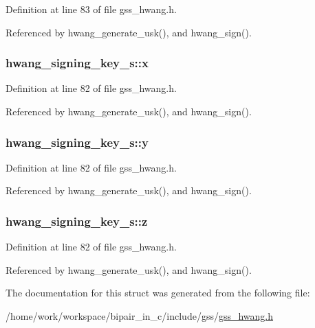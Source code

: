 Definition at line 83 of file gss\-\_\-hwang.\-h.



Referenced by hwang\-\_\-generate\-\_\-usk(), and hwang\-\_\-sign().

\hypertarget{structhwang__signing__key__s_a4bc042988eb9502f13b5d9a39d464162}{
\subsubsection[{x}]{ hwang\-\_\-signing\-\_\-key\-\_\-s\-::x}}\label{structhwang__signing__key__s_a4bc042988eb9502f13b5d9a39d464162}


Definition at line 82 of file gss\-\_\-hwang.\-h.



Referenced by hwang\-\_\-generate\-\_\-usk(), and hwang\-\_\-sign().

\hypertarget{structhwang__signing__key__s_a4e4cf40f89a8ae9719f7af364568758c}{
\subsubsection[{y}]{ hwang\-\_\-signing\-\_\-key\-\_\-s\-::y}}\label{structhwang__signing__key__s_a4e4cf40f89a8ae9719f7af364568758c}


Definition at line 82 of file gss\-\_\-hwang.\-h.



Referenced by hwang\-\_\-generate\-\_\-usk(), and hwang\-\_\-sign().

\hypertarget{structhwang__signing__key__s_a449002dc7e21a8911b688d7c0f9a3ab7}{
\subsubsection[{z}]{ hwang\-\_\-signing\-\_\-key\-\_\-s\-::z}}\label{structhwang__signing__key__s_a449002dc7e21a8911b688d7c0f9a3ab7}


Definition at line 82 of file gss\-\_\-hwang.\-h.



Referenced by hwang\-\_\-generate\-\_\-usk(), and hwang\-\_\-sign().



The documentation for this struct was generated from the following file\-:\begin{DoxyCompactItemize}
\item 
/home/work/workspace/bipair\-\_\-in\-\_\-c/include/gss/\hyperlink{gss__hwang_8h}{gss\-\_\-hwang.\-h}\end{DoxyCompactItemize}
